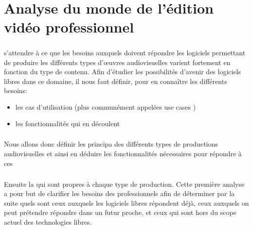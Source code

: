 \chapter {Analyse du monde de l'édition vidéo professionnel}

\minitoc \mtcskip \newpage


\paragraph{}

s'attendre à ce que les besoins auxquels doivent répondre les logiciels
permettant de produire les différents types d'œuvres audiovisuelles
varient fortement en fonction du type de contenu. Afin d'étudier les
possibilités d'avenir des logiciels libres dans ce domaine, il nous
faut définir, pour en connaître les différents besoins:

\begin{itemize} \setlength{\itemsep}{2mm}

  \item {les cas d'utilisation (plus communément appelées use cases
    )}

  \item {les fonctionnalités qui en découlent}

\end{itemize}


\paragraph{}

Nous allons donc définir les principa%
des différents types de productions audiovisuelles et ainsi en déduire
les fonctionnalités nécessaires pour répondre à ces %

\paragraph{}

Ensuite %
la %
qui sont propres à chaque type de production. Cette première analyse a
pour but de clarifier les besoins des professionnels afin de déterminer
par la suite quels sont ceux auxquels les logiciels libres répondent
déjà, ceux auxquels on peut prétendre répondre dans un futur proche,
et ceux qui sont hors du scope actuel des technologies libres.

